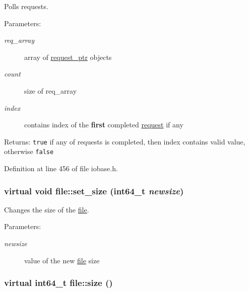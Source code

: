 Polls requests. 

\begin{Desc}
\item[Parameters:]
\begin{description}
\item[{\em req\_\-array}]array of \hyperlink{classrequest__ptr}{request\_\-ptr} objects \item[{\em count}]size of req\_\-array \item[{\em index}]contains index of the {\bf first} completed \hyperlink{classrequest}{request} if any \end{description}
\end{Desc}
\begin{Desc}
\item[Returns:]{\tt true} if any of requests is completed, then index contains valid value, otherwise {\tt false} \end{Desc}


Definition at line 456 of file iobase.h.\hypertarget{group__iolayer_g0388ba482ccd9be978edef3d54e2e41c}{
\subsubsection[{set\_\-size}]{\setlength{\rightskip}{0pt plus 5cm}virtual void file::set\_\-size (int64\_\-t {\em newsize})}}
\label{group__iolayer_g0388ba482ccd9be978edef3d54e2e41c}


Changes the size of the \hyperlink{classfile}{file}. 

\begin{Desc}
\item[Parameters:]
\begin{description}
\item[{\em newsize}]value of the new \hyperlink{classfile}{file} size \end{description}
\end{Desc}
\hypertarget{group__iolayer_g452fdcecf86299ffda1aba728a28c98d}{
\subsubsection[{size}]{\setlength{\rightskip}{0pt plus 5cm}virtual int64\_\-t file::size ()}}
\label{group__iolayer_g452fdcecf86299ffda1aba728a28c98d}


